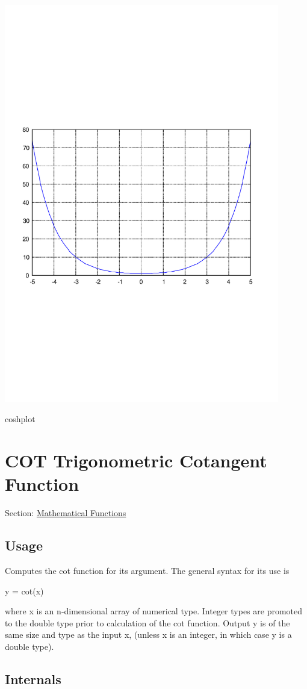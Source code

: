  
\begin{DoxyImage}
\includegraphics[width=12cm]{coshplot}
\caption{coshplot}
\end{DoxyImage}
 \hypertarget{mathfunctions_cot}{}\section{C\-O\-T Trigonometric Cotangent Function}\label{mathfunctions_cot}
Section\-: \hyperlink{sec_mathfunctions}{Mathematical Functions} \hypertarget{vtkwidgets_vtkxyplotwidget_Usage}{}\subsection{Usage}\label{vtkwidgets_vtkxyplotwidget_Usage}
Computes the {\ttfamily cot} function for its argument. The general syntax for its use is \begin{DoxyVerb}  y = cot(x)
\end{DoxyVerb}
 where {\ttfamily x} is an {\ttfamily n}-\/dimensional array of numerical type. Integer types are promoted to the {\ttfamily double} type prior to calculation of the {\ttfamily cot} function. Output {\ttfamily y} is of the same size and type as the input {\ttfamily x}, (unless {\ttfamily x} is an integer, in which case {\ttfamily y} is a {\ttfamily double} type). \hypertarget{transforms_svd_Function}{}\subsection{Internals}\label{transforms_svd_Function}
